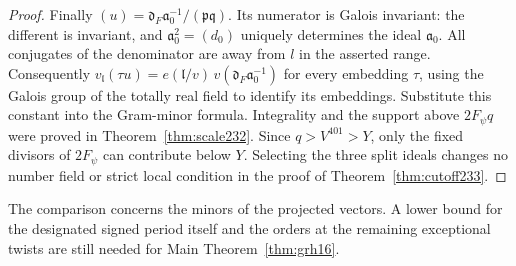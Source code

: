\documentclass[a4paper,11pt]{article}
\theoremstyle{definition}
\theoremstyle{remark}
\numberwithin{equation}{section}
\begin{document}
\begin{proof}
Finally \((u)=\mathfrak d_F\mathfrak a_0^{-1}/(\mathfrak p\mathfrak q)\).
Its numerator is Galois invariant: the different is invariant, and
\(\mathfrak a_0^2=(d_0)\) uniquely determines the ideal
\(\mathfrak a_0\). All conjugates of the denominator are away
from \(l\) in the asserted range. Consequently
\(v_{\mathfrak l}(\tau u)=e(\mathfrak l/v)\,v(\mathfrak d_F
\mathfrak a_0^{-1})\) for every embedding \(\tau\), using the
Galois group of the totally real field to identify its embeddings.
Substitute this constant into the Gram-minor formula. Integrality
and the support above \(2F_\psi q\) were proved in Theorem~\ref{thm:scale232}. Since \(q>V^{401}>Y\), only the fixed
divisors of \(2F_\psi\) can contribute below \(Y\). Selecting
the three split ideals changes no number field or strict local
condition in the proof of Theorem~\ref{thm:cutoff233}.
\end{proof}

The comparison concerns the minors of the projected vectors. A
lower bound for the designated signed period itself and the orders
at the remaining exceptional twists are still needed for
Main Theorem~\ref{thm:grh16}.
\end{document}
